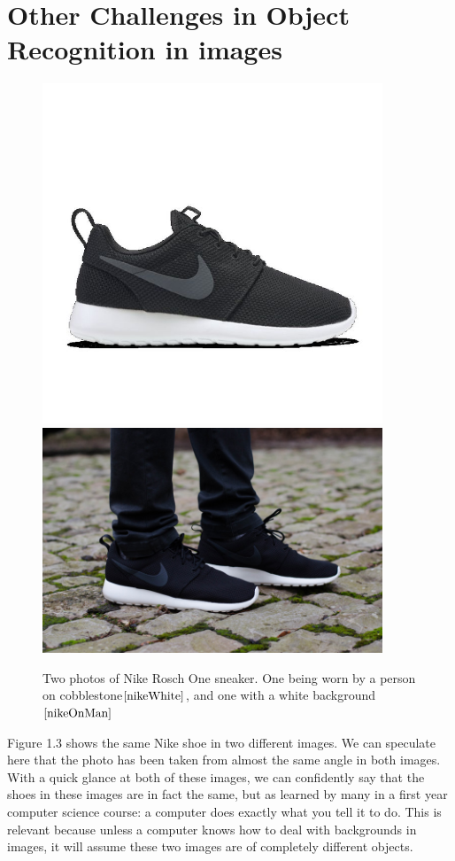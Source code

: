 \documentclass[12pt]{report} %
\begin{document}
\section{Other Challenges in Object Recognition in images}
\begin{figure}
\centering
\includegraphics[width=4in]{nike} 
\centering
\includegraphics[width=4in]{nike_on_man} 
\caption{Two photos of Nike Rosch One sneaker. One being worn by a person on cobblestone$\cite{nikeWhite}$, and one with a white background$\cite{nikeOnMan}$}
\label{fig: Sneaker Images with Different Backgrounds}
\end{figure}
	
	Figure 1.3 shows the same Nike shoe in two different images. We can speculate here that the photo has been taken from almost the same angle in both images. With a quick glance at both of these images, we can confidently say that the shoes in these images are in fact the same, but as learned by many in a first year computer science course: a computer does exactly what you tell it to do. This is relevant because unless a computer knows how to deal with backgrounds in images, it will assume these two images are of completely different objects. 
\end{document}
